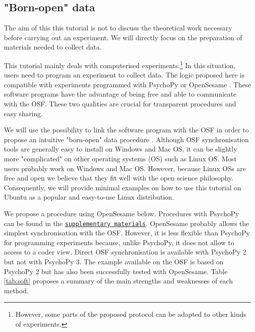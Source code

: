 \documentclass[a4paper,jou,natbib,floatsintext,donotrepeattitle]{apa6}
\begin{document}
\subsection{"Born-open" data}

The aim of this this tutorial is not to discuss the theoretical work necessary before carrying out an experiment. We will directly focus on the preparation of materials needed to collect data. 

This tutorial mainly deals with computerised experiments.\footnote{However, some parts of the proposed protocol can be adapted to other kinds of experiments.} In this situation, users need to program an experiment to collect data. The logic proposed here is compatible with experiments programmed with PsychoPy \citep{peirce_PsychoPypsychophysics_2007,peirce_generating_2008,peirce_psychopy2_2019} or OpenSesame \citep{mathot_opensesame_2012}. These software programs have the advantage of being free and able to communicate with the OSF. These two qualities are crucial for transparent procedures and easy sharing. 

We will use the possibility to link the software program with the OSF in order to propose an intuitive "born-open" data procedure \citep{rouder_what_2016}. Although OSF synchronisation tools are generally easy to install on Windows and Mac OS, it can be slightly more "complicated" on other operating systems (OS) such as Linux OS. Most users probably work on Windows and Mac OS. However, because Linux OSs are free and open we believe that they fit well with the open science philosophy. Consequently, we will provide minimal examples on how to use this tutorial on Ubuntu as a popular and easy-to-use Linux distribution. \break

We propose a procedure using OpenSesame below. Procedures with PsychoPy can be found in the \hyperref[sec:supp]{\texttt{supplementary materials}}. OpenSesame probably allows the simplest synchronisation with the OSF. However, it is less flexible than PsychoPy for programming experiments because, unlike PsychoPy, it does not allow to access to a coder view. Direct OSF synchronisation is available with PsychoPy 2 but not with PsychoPy 3. The example available on the OSF is based on PsychoPy 2 but has also been successfully tested with OpenSesame. Table \ref{tab:soft} proposes a summary of the main strengths and weaknesses of each method.\\
\end{document}
